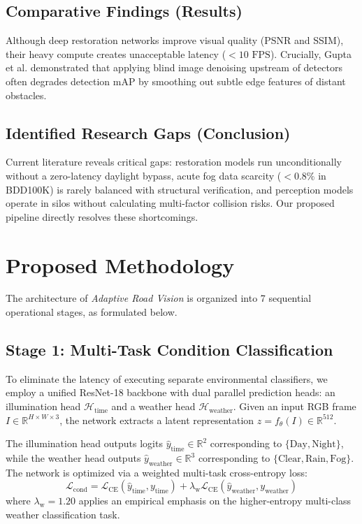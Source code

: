 \documentclass[conference]{IEEEtran}
\begin{document}
\subsection{Comparative Findings (Results)}
Although deep restoration networks improve visual quality (PSNR and SSIM), their heavy compute creates unacceptable latency ($<10\text{ FPS}$). Crucially, Gupta et al. \cite{gupta2024robust} demonstrated that applying blind image denoising upstream of detectors often degrades detection mAP by smoothing out subtle edge features of distant obstacles.

\subsection{Identified Research Gaps (Conclusion)}
Current literature reveals critical gaps: restoration models run unconditionally without a zero-latency daylight bypass, acute fog data scarcity ($<0.8\%$ in BDD100K) is rarely balanced with structural verification, and perception models operate in silos without calculating multi-factor collision risks. Our proposed pipeline directly resolves these shortcomings.

\section{Proposed Methodology}
\label{sec:methodology}

The architecture of \textit{Adaptive Road Vision} is organized into 7 sequential operational stages, as formulated below.

\subsection{Stage 1: Multi-Task Condition Classification}
To eliminate the latency of executing separate environmental classifiers, we employ a unified ResNet-18 backbone with dual parallel prediction heads: an illumination head $\mathcal{H}_{\text{time}}$ and a weather head $\mathcal{H}_{\text{weather}}$. Given an input RGB frame $I \in \mathbb{R}^{H \times W \times 3}$, the network extracts a latent representation $z = f_{\theta}(I) \in \mathbb{R}^{512}$.

The illumination head outputs logits $\hat{y}_{\text{time}} \in \mathbb{R}^2$ corresponding to $\{\text{Day}, \text{Night}\}$, while the weather head outputs $\hat{y}_{\text{weather}} \in \mathbb{R}^3$ corresponding to $\{\text{Clear}, \text{Rain}, \text{Fog}\}$. The network is optimized via a weighted multi-task cross-entropy loss:
\begin{equation}
\mathcal{L}_{\text{cond}} = \mathcal{L}_{\text{CE}}(\hat{y}_{\text{time}}, y_{\text{time}}) + \lambda_{\text{w}} \mathcal{L}_{\text{CE}}(\hat{y}_{\text{weather}}, y_{\text{weather}})
\label{eq:condition_loss}
\end{equation}
where $\lambda_{\text{w}} = 1.20$ applies an empirical emphasis on the higher-entropy multi-class weather classification task.
\end{document}

